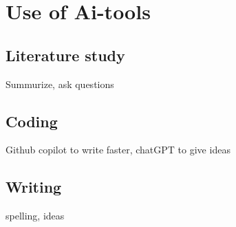\section{Use of Ai-tools}

\subsection{Literature study}
Summurize, ask questions
\subsection{Coding}
Github copilot to write faster, chatGPT to give ideas
\subsection{Writing}
spelling, ideas


